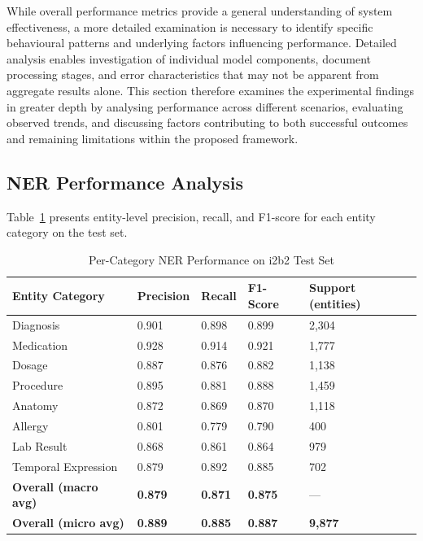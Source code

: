 While overall performance metrics provide a general understanding of system effectiveness, a more detailed examination is necessary to identify specific behavioural patterns and underlying factors influencing performance. Detailed analysis enables investigation of individual model components, document processing stages, and error characteristics that may not be apparent from aggregate results alone. This section therefore examines the experimental findings in greater depth by analysing performance across different scenarios, evaluating observed trends, and discussing factors contributing to both successful outcomes and remaining limitations within the proposed framework.

\subsection{NER Performance Analysis}
Table~\ref{tab:ner_performance} presents entity-level precision, recall, and F1-score for each entity category on the test set.

\begin{table}[htbp]
\centering
\caption{Per-Category NER Performance on i2b2 Test Set}
\label{tab:ner_performance}
\begin{tabular}{|p{4cm}|p{2cm}|p{2cm}|p{2cm}|p{3cm}|}
\hline
\textbf{Entity Category} & \textbf{Precision} & \textbf{Recall} & \textbf{F1-Score} & \textbf{Support (entities)} \\
\hline
Diagnosis & 0.901 & 0.898 & 0.899 & 2,304 \\
\hline
Medication & 0.928 & 0.914 & 0.921 & 1,777 \\
\hline
Dosage & 0.887 & 0.876 & 0.882 & 1,138 \\
\hline
Procedure & 0.895 & 0.881 & 0.888 & 1,459 \\
\hline
Anatomy & 0.872 & 0.869 & 0.870 & 1,118 \\
\hline
Allergy & 0.801 & 0.779 & 0.790 & 400 \\
\hline
Lab Result & 0.868 & 0.861 & 0.864 & 979 \\
\hline
Temporal Expression & 0.879 & 0.892 & 0.885 & 702 \\
\hline
\textbf{Overall (macro avg)} & \textbf{0.879} & \textbf{0.871} & \textbf{0.875} & --- \\
\hline
\textbf{Overall (micro avg)} & \textbf{0.889} & \textbf{0.885} & \textbf{0.887} & \textbf{9,877} \\
\hline
\end{tabular}
\end{table}

